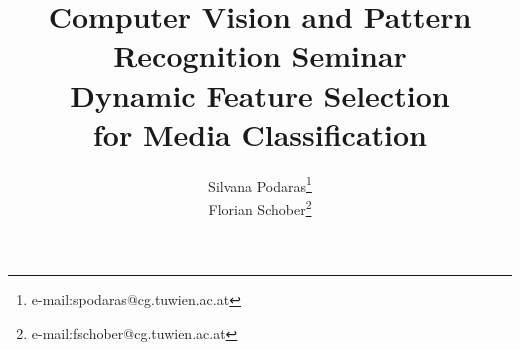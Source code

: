 \documentclass[conference,onecolumn]{acmsiggraph}
\title{
{\LARGE Computer Vision and Pattern Recognition Seminar } 
 \\ \medskip
 {\fontsize{36}{48} \selectfont 
  Dynamic Feature Selection
  \\ \medskip 
   for Media Classification}}
\author{Silvana Podaras\thanks{e-mail:spodaras@cg.tuwien.ac.at}\\Florian Schober\thanks{e-mail:fschober@cg.tuwien.ac.at}}
\begin{document}
\fontsize{10}{12} \selectfont
\renewcommand{\abstractname}{\fontsize{10}{12} \selectfont Abstract}
 
\maketitle
\copyrightspace

\newpage

\tableofcontents
\newpage






\fontsize{8}{10} \selectfont



\end{document}
